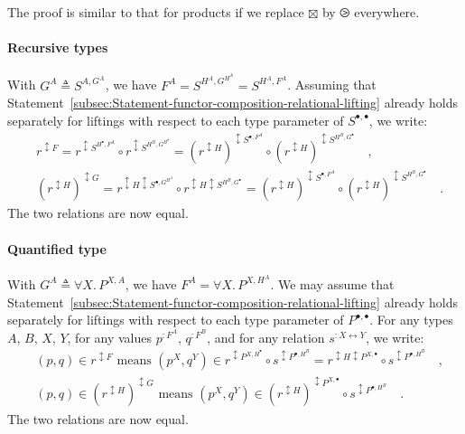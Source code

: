 The proof is similar to that for products if we replace $\boxtimes$
by $\ogreaterthan$ everywhere.

\paragraph{Recursive types}

With $G^{A}\triangleq S^{A,G^{A}}$, we have $F^{A}=S^{H^{A},G^{H^{A}}}=S^{H^{A},F^{A}}$.
Assuming that Statement~\ref{subsec:Statement-functor-composition-relational-lifting}
already holds separately for liftings with respect to each type parameter
of $S^{\bullet,\bullet}$, we write:
\begin{align*}
 & r^{\updownarrow F}=r^{\updownarrow S^{H^{\bullet},F^{A}}}\circ r^{\updownarrow S^{H^{B},G^{H^{\bullet}}}}=(r^{\updownarrow H})^{\updownarrow S^{\bullet,F^{A}}}\circ(r^{\updownarrow H})^{\updownarrow S^{H^{B},G^{\bullet}}}\quad,\\
 & (r^{\updownarrow H})^{\updownarrow G}=r^{\updownarrow H\updownarrow S^{\bullet,G^{H^{A}}}}\circ r^{\updownarrow H\updownarrow S^{H^{B},G^{\bullet}}}=(r^{\updownarrow H})^{\updownarrow S^{\bullet,F^{A}}}\circ(r^{\updownarrow H})^{\updownarrow S^{H^{B},G^{\bullet}}}\quad.
\end{align*}
The two relations are now equal.

\paragraph{Quantified type}

With $G^{A}\triangleq\forall X.\,P^{X,A}$, we have $F^{A}=\forall X.\,P^{X,H^{A}}$.
We may assume that Statement~\ref{subsec:Statement-functor-composition-relational-lifting}
already holds separately for liftings with respect to each type parameter
of $P^{\bullet,\bullet}$. For any types $A$, $B$, $X$, $Y$, for
any values $p^{:F^{A}}$, $q^{:F^{B}}$, and for any relation $s^{:X\leftrightarrow Y}$,
we write:
\begin{align*}
 & (p,q)\in r^{\updownarrow F}\text{ means }(p^{X},q^{Y})\in r^{\updownarrow P^{X,H^{\bullet}}}\circ s^{\updownarrow P^{\bullet,H^{B}}}=r^{\updownarrow H\updownarrow P^{X,\bullet}}\circ s^{\updownarrow P^{\bullet,H^{B}}}\quad,\\
 & (p,q)\in(r^{\updownarrow H})^{\updownarrow G}\text{ means }(p^{X},q^{Y})\in(r^{\updownarrow H})^{\updownarrow P^{X,\bullet}}\circ s^{\updownarrow P^{\bullet,H^{B}}}\quad.
\end{align*}
The two relations are now equal.

